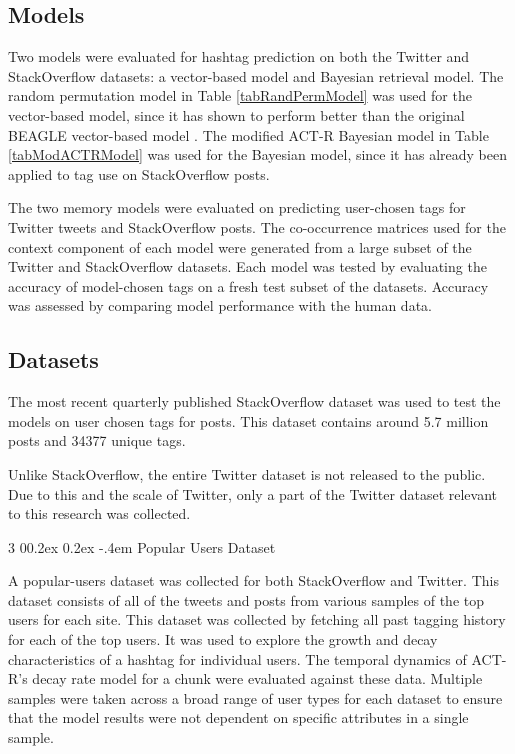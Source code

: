 \documentclass[man,floatsintext,donotrepeattitle]{apa6}
\makeatletter
\renewcommand{\subsubsection}{%
  \@startsection
  {subsubsection}%
  {3}%
  {\parindent}%
  {0\baselineskip \@plus 0.2ex \@minus 0.2ex}%
  {-.4em}%
  {\normalfont\normalsize\bfseries\addperi}}
\makeatother
\begin{document}
\subsection{Models}

Two models were evaluated for hashtag prediction on both the Twitter and StackOverflow datasets: a vector-based model and Bayesian retrieval model.
The random permutation model \parencite{Sahlgren2008} in Table \ref{tabRandPermModel} was used for the vector-based model,
since it has shown to perform better than the original BEAGLE vector-based model \parencite{Recchia2010}.
The modified ACT-R Bayesian model \parencite{Stanley2013} in Table \ref{tabModACTRModel} was used for the Bayesian model, since it has already been applied to tag use on StackOverflow posts.

The two memory models were evaluated on predicting user-chosen tags for Twitter tweets and StackOverflow posts.
The co-occurrence matrices used for the context component of each model were generated from a large subset of the Twitter and StackOverflow datasets.
Each model was tested by evaluating the accuracy of model-chosen tags on a fresh test subset of the datasets.
Accuracy was assessed by comparing model performance with the human data.

\subsection{Datasets}

The most recent quarterly published StackOverflow dataset \parencite{DataDump2014} was used to test the models on user chosen tags for posts.
This dataset contains around \num{5.7} million posts and \num{34377} unique tags.

Unlike StackOverflow, the entire Twitter dataset is not released to the public.
Due to this and the scale of Twitter, only a part of the Twitter dataset relevant to this research was collected.

\subsubsection{Popular Users Dataset}

A popular-users dataset was collected for both StackOverflow and Twitter.
This dataset consists of all of the tweets and posts from various samples of the top users for each site.
This dataset was collected by fetching all past tagging history for each of the top users.
It was used to explore the growth and decay characteristics of a hashtag for individual users.
The temporal dynamics of ACT-R's decay rate model for a chunk were evaluated against these data.
Multiple samples were taken across a broad range of user types for each dataset to ensure that the model results were not dependent on specific attributes in a single sample.
\end{document}

